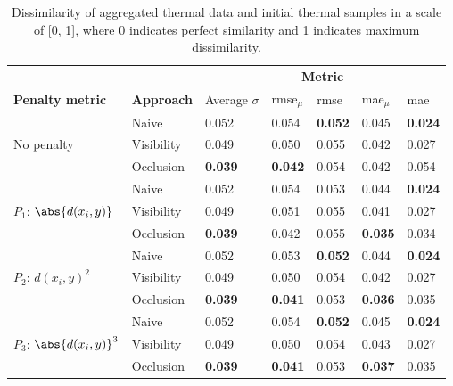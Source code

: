 \renewcommand{\arraystretch}{1.2}
\begin{table}[ht]
    \sffamily\footnotesize
    \caption{Dissimilarity of aggregated thermal data and initial thermal samples in a scale of [0, 1], where 0 indicates perfect similarity and 1 indicates maximum dissimilarity. }
    \label{table:thermal_error_dispersion}
    \begin{tabular}{@{}lllllll@{}}
    \toprule
    & & \multicolumn{5}{c}{\textbf{Metric}} \\
    \cmidrule{3-7}
    \textbf{Penalty metric} & \textbf{Approach} & Average $\sigma$ & \acrshort{rmse}$_{\mu}$ & \acrshort{rmse} & \acrshort{mae}$_{\mu}$ & \acrshort{mae}\\
    \midrule
    \multirow{3}{*}{No penalty} & Naive & 0.052 & 0.054 & \textbf{0.052} & 0.045 & \textbf{0.024}\\
    & Visibility & 0.049 & 0.050 & 0.055 & 0.042 & 0.027\\
    & Occlusion & \textbf{0.039} & \textbf{0.042} & 0.054 & 0.042 & 0.054\\
    \midrule
    \multirow{3}{*}{$P_1$: $\abs{d(x_i, y)}$} & Naive & 0.052 & 0.054 & 0.053 & 0.044 & \textbf{0.024} \\
    & Visibility & 0.049 & 0.051 & 0.055 & 0.041 & 0.027 \\
    & Occlusion & \textbf{0.039} & 0.042 & 0.055 & \textbf{0.035} & 0.034\\
    \midrule
    \multirow{3}{*}{$P_2$: $d(x_i, y)^2$} & Naive & 0.052 & 0.053 & \textbf{0.052} & 0.044 & \textbf{0.024} \\
    & Visibility & 0.049 & 0.050 & 0.054 & 0.042 & 0.027 \\
    & Occlusion & \textbf{0.039} & \textbf{0.041} & 0.053 & \textbf{0.036} & 0.035\\
    \midrule
    \multirow{3}{*}{$P_3$: $\abs{d(x_i, y)}^3$} & Naive & 0.052 & 0.054 & \textbf{0.052} & 0.045 & \textbf{0.024} \\
    & Visibility & 0.049 & 0.050 & 0.054 & 0.043 & 0.027 \\
    & Occlusion & \textbf{0.039} & \textbf{0.041} & 0.053 & \textbf{0.037} & 0.035 \\
    \bottomrule
    \end{tabular}
    \normalsize
\end{table}
\renewcommand{\arraystretch}{1}

